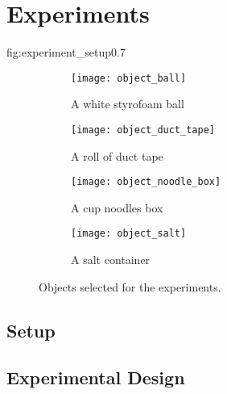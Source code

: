 
\chapter{Experiments}

             {fig:experiment_setup}{0.7\textwidth}

\begin{figure}[htb]
    \centering
    \small
    \begin{subfigure}[b]{0.45\textwidth}
        \texttt{[image: object\_ball]}
        \caption{A white styrofoam ball}
        \label{fig:object_ball}
    \end{subfigure}
    \hfill
    \begin{subfigure}[b]{0.45\textwidth}
        \texttt{[image: object\_duct\_tape]}
        \caption{A roll of duct tape}
        \label{fig:object_duct_tape}
    \end{subfigure}
    
    \begin{subfigure}[b]{0.45\textwidth}
        \texttt{[image: object\_noodle\_box]}
        \caption{A cup noodles box}
        \label{fig:object_noodle_box}
    \end{subfigure}
    \hfill
    \begin{subfigure}[b]{0.45\textwidth}
        \texttt{[image: object\_salt]}
        \caption{A salt container}
        \label{fig:object_salt}
    \end{subfigure}
    \caption{Objects selected for the experiments.}\label{fig:objects}
\end{figure}

\section{Setup}

\section{Experimental Design}
